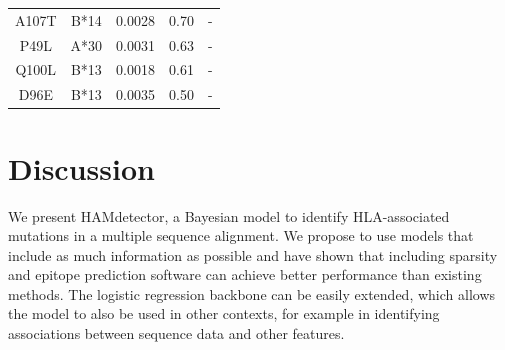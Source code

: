 \documentclass[fleqn,11pt]{SelfArx} %
\begin{document}
\begin{table}[h!]
\begin{tabular}{c|c|c|c|c}
  A107T       & B*14 & 0.0028                        & 0.70                                & -                        \\
  P49L        & A*30 & 0.0031                        & 0.63                                & -                        \\
  Q100L       & B*13 & 0.0018                        & 0.61                                & -                        \\
  D96E        & B*13 & 0.0035                        & 0.50                                & -                       
  \end{tabular}
  \label{tab:false-positives}
 \end{table}

\section{Discussion}

We present HAMdetector, a Bayesian model to identify HLA-associated mutations in a multiple sequence alignment. We propose to use models that include as much information as possible and have shown that including sparsity and epitope prediction software can achieve better performance than existing methods. The logistic regression backbone can be easily extended, which allows the model to also be used in other contexts, for example in identifying associations between sequence data and other features.


\thispagestyle{empty} %
\FloatBarrier



\end{document}
